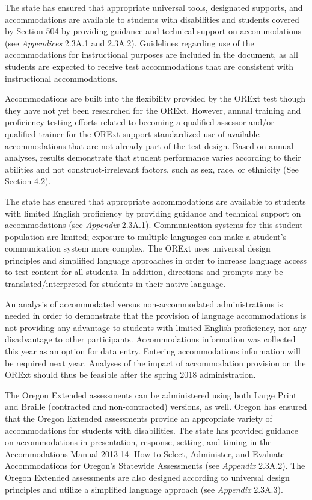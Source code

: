 \documentclass[]{article}
\begin{document}
The state has ensured that appropriate universal tools, designated
supports, and accommodations are available to students with disabilities
and students covered by Section 504 by providing guidance and technical
support on accommodations (see \emph{Appendices} 2.3A.1 and 2.3A.2).
Guidelines regarding use of the accommodations for instructional
purposes are included in the document, as all students are expected to
receive test accommodations that are consistent with instructional
accommodations.

Accommodations are built into the flexibility provided by the ORExt test
though they have not yet been researched for the ORExt. However, annual
training and proficiency testing efforts related to becoming a qualified
assessor and/or qualified trainer for the ORExt support standardized use
of available accommodations that are not already part of the test
design. Based on annual analyses, results demonstrate that student
performance varies according to their abilities and not
construct-irrelevant factors, such as sex, race, or ethnicity (See
Section 4.2).

The state has ensured that appropriate accommodations are available to
students with limited English proficiency by providing guidance and
technical support on accommodations (see \emph{Appendix} 2.3A.1).
Communication systems for this student population are limited; exposure
to multiple languages can make a student's communication system more
complex. The ORExt uses universal design principles and simplified
language approaches in order to increase language access to test content
for all students. In addition, directions and prompts may be
translated/interpreted for students in their native language.

An analysis of accommodated versus non-accommodated administrations is
needed in order to demonstrate that the provision of language
accommodations is not providing any advantage to students with limited
English proficiency, nor any disadvantage to other participants.
Accommodations information was collected this year as an option for data
entry. Entering accommodations information will be required next year.
Analyses of the impact of accommodation provision on the ORExt should
thus be feasible after the spring 2018 administration.

The Oregon Extended assessments can be administered using both Large
Print and Braille (contracted and non-contracted) versions, as well.
Oregon has ensured that the Oregon Extended assessments provide an
appropriate variety of accommodations for students with disabilities.
The state has provided guidance on accommodations in presentation,
response, setting, and timing in the Accommodations Manual 2013-14: How
to Select, Administer, and Evaluate Accommodations for Oregon's
Statewide Assessments (see \emph{Appendix} 2.3A.2). The Oregon Extended
assessments are also designed according to universal design principles
and utilize a simplified language approach (see \emph{Appendix} 2.3A.3).
\end{document}
